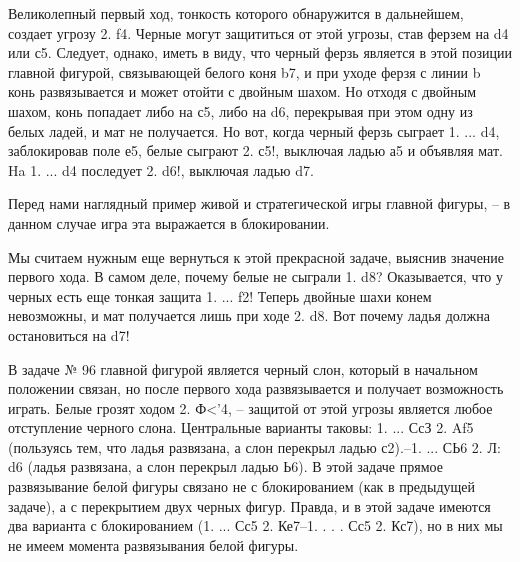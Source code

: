 Великолепный первый ход, тонкость которого обнаружится в дальнейшем, создает угрозу 2. \queen{}f4\mate{}. Черные могут защититься от этой угрозы, став ферзем на d4 или с5. Следует, однако, иметь в виду, что черный ферзь является в этой позиции главной фигурой, связывающей белого коня b7, и при уходе ферзя с линии b конь развязывается и может отойти с двойным шахом. Но отходя с двойным шахом, конь попадает либо на с5, либо на d6, перекрывая при этом одну из белых ладей, и мат не получается. Но вот, когда черный ферзь сыграет 1. ... \queen{}d4, заблокировав поле е5, белые сыграют 2. \knight{}с5\mate{}!, выключая ладью а5 и объявляя мат. Ha 1. ... \queen{}d4 последует 2. \knight{}d6\mate{}!, выключая ладью d7.

Перед нами наглядный пример живой и стратегической игры главной фигуры, -- в данном случае игра эта выражается в блокировании.

Мы считаем нужным еще вернуться к этой прекрасной задаче, выяснив значение первого хода. В самом деле, почему белые не сыграли 1. \rook{}d8? Оказывается, что у черных есть еще тонкая защита 1. ... \queen{}f2! Теперь двойные шахи конем невозможны, и мат получается лишь при ходе 2. \knight{}d8\mate{}. Вот почему ладья должна остановиться на d7!

В задаче № 96 главной фигурой является черный слон, который в начальном положении связан, но после первого хода развязывается и получает возможность играть. Белые грозят ходом 2. Ф<’4, -- защитой от этой угрозы является любое отступление черного слона. Центральные варианты таковы: 1. ... СсЗ 2. Af5 (пользуясь тем, что ладья развязана, а слон перекрыл ладью с2).--1. ... СЬ6 2. Л: d6 (ладья развязана, а слон перекрыл ладью Ь6). В этой задаче прямое развязывание белой фигуры связано не с блокированием (как в предыдущей задаче), а с перекрытием двух черных фигур. Правда, и в этой задаче имеются два варианта с блокированием (1. ... Сс5 2. Ке7--1. . . . Сс5 2. Кс7), но в них мы не имеем момента развязывания белой фигуры.
 
